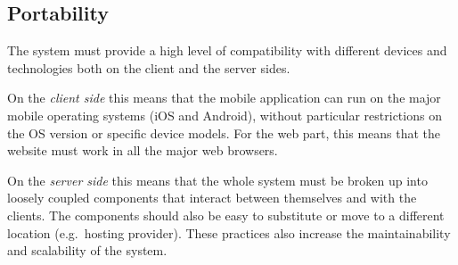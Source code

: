 \subsection{Portability}
The system must provide a high level of compatibility with different devices
and technologies both on the client and the server sides.

On the \emph{client side} this means that the mobile application can run on the
major mobile operating systems (iOS and Android), without particular
restrictions on the OS version or specific device models. For the web part, this
means that the website must work in all the major web browsers.

On the \emph{server side} this means that the whole system must be broken up
into loosely coupled components that interact between themselves and with the
clients. The components should also be easy to substitute or move to a different
location (e.g.\ hosting provider).
These practices also increase the maintainability and scalability of the system.